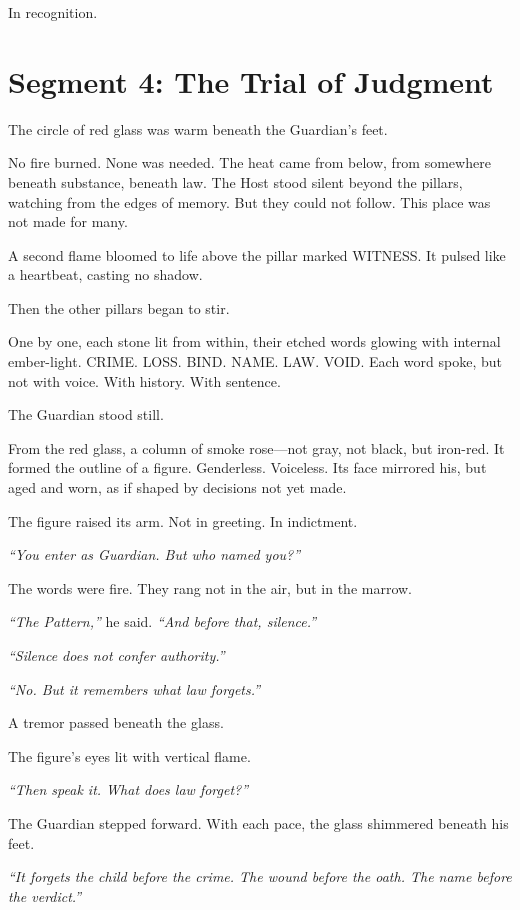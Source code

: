\documentclass[9pt]{article}
\begin{document}
In recognition.

\newpage

\section*{Segment 4: The Trial of Judgment}

The circle of red glass was warm beneath the Guardian’s feet.

No fire burned. None was needed. The heat came from below, from somewhere beneath substance, beneath law. The Host stood silent beyond the pillars, watching from the edges of memory. But they could not follow. This place was not made for many.

A second flame bloomed to life above the pillar marked \textsc{WITNESS}. It pulsed like a heartbeat, casting no shadow.

Then the other pillars began to stir.

One by one, each stone lit from within, their etched words glowing with internal ember-light. \textsc{CRIME}. \textsc{LOSS}. \textsc{BIND}. \textsc{NAME}. \textsc{LAW}. \textsc{VOID}. Each word spoke, but not with voice. With history. With sentence.

The Guardian stood still.

From the red glass, a column of smoke rose—not gray, not black, but iron-red. It formed the outline of a figure. Genderless. Voiceless. Its face mirrored his, but aged and worn, as if shaped by decisions not yet made.

The figure raised its arm. Not in greeting. In indictment.

\textit{``You enter as Guardian. But who named you?''}

The words were fire. They rang not in the air, but in the marrow.

\textit{``The Pattern,''} he said. \textit{``And before that, silence.''}

\textit{``Silence does not confer authority.''}

\textit{``No. But it remembers what law forgets.''}

A tremor passed beneath the glass.

The figure's eyes lit with vertical flame.

\textit{``Then speak it. What does law forget?''}

The Guardian stepped forward. With each pace, the glass shimmered beneath his feet.

\textit{``It forgets the child before the crime. The wound before the oath. The name before the verdict.''}
\end{document}
